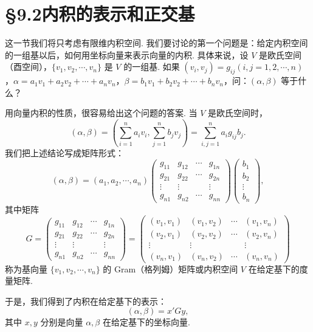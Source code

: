 \documentclass[UTF8,12pt,a4paper,fontset=fandol]{ctexart}
\begin{document}
\section*{§9.2\quad 内积的表示和正交基}

这一节我们将只考虑有限维内积空间. 我们要讨论的第一个问题是：给定内积空间的一组基以后，如何用坐标向量来表示向量的内积. 具体来说，设 $V$ 是欧氏空间（酉空间），$\{v_1,v_2,\cdots,v_n\}$ 是 $V$ 的一组基. 如果 $(v_i,v_j)=g_{ij}(i,j=1,2,\cdots,n)$，$\alpha=a_1v_1+a_2v_2+\cdots+a_nv_n$，$\beta=b_1v_1+b_2v_2+\cdots+b_nv_n$，问：$(\alpha,\beta)$ 等于什么？

用向量内积的性质，很容易给出这个问题的答案. 当 $V$ 是欧氏空间时，
\[
  (\alpha,\beta)=\left(\sum_{i=1}^n a_iv_i,\sum_{j=1}^n b_jv_j\right)
  =\sum_{i,j=1}^n a_ig_{ij}b_j.
\]
我们把上述结论写成矩阵形式：
\[
  (\alpha,\beta)=
  (a_1,a_2,\cdots,a_n)
  \left(\begin{array}{cccc}
    g_{11} & g_{12} & \cdots & g_{1n}\\
    g_{21} & g_{22} & \cdots & g_{2n}\\
    \vdots & \vdots & & \vdots\\
    g_{n1} & g_{n2} & \cdots & g_{nn}
  \end{array}\right)
  \left(\begin{array}{c}
    b_1\\ b_2\\ \vdots\\ b_n
  \end{array}\right),
\]
其中矩阵
\[
  G=
  \left(\begin{array}{cccc}
    g_{11} & g_{12} & \cdots & g_{1n}\\
    g_{21} & g_{22} & \cdots & g_{2n}\\
    \vdots & \vdots & & \vdots\\
    g_{n1} & g_{n2} & \cdots & g_{nn}
  \end{array}\right)
  =
  \left(\begin{array}{cccc}
    (v_1,v_1) & (v_1,v_2) & \cdots & (v_1,v_n)\\
    (v_2,v_1) & (v_2,v_2) & \cdots & (v_2,v_n)\\
    \vdots & \vdots & & \vdots\\
    (v_n,v_1) & (v_n,v_2) & \cdots & (v_n,v_n)
  \end{array}\right)
\]
称为基向量 $\{v_1,v_2,\cdots,v_n\}$ 的 Gram（格列姆）矩阵或内积空间 $V$ 在给定基下的度量矩阵.

于是，我们得到了内积在给定基下的表示：
\begin{equation}
  (\alpha,\beta)=x'Gy,
  \tag{9.2.1}
\end{equation}
其中 $x,y$ 分别是向量 $\alpha,\beta$ 在给定基下的坐标向量.
\end{document}
